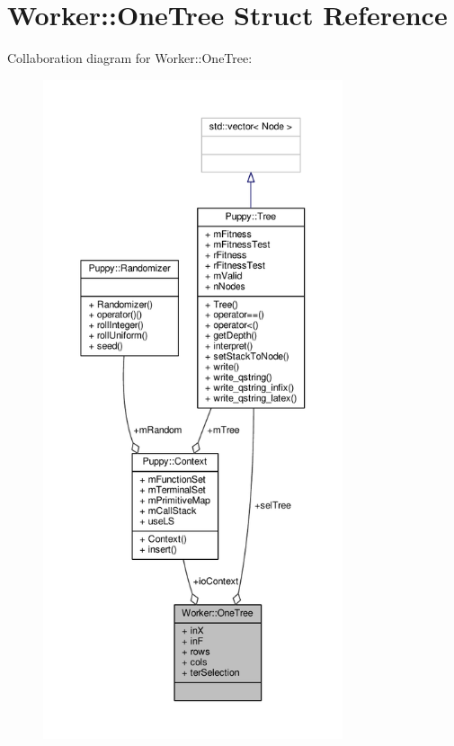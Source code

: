 \hypertarget{structWorker_1_1OneTree}{}\section{Worker\+:\+:One\+Tree Struct Reference}
\label{structWorker_1_1OneTree}


Collaboration diagram for Worker\+:\+:One\+Tree\+:
\nopagebreak
\begin{figure}[H]
\begin{center}
\leavevmode
\includegraphics[height=550pt]{structWorker_1_1OneTree__coll__graph}
\end{center}
\end{figure}
